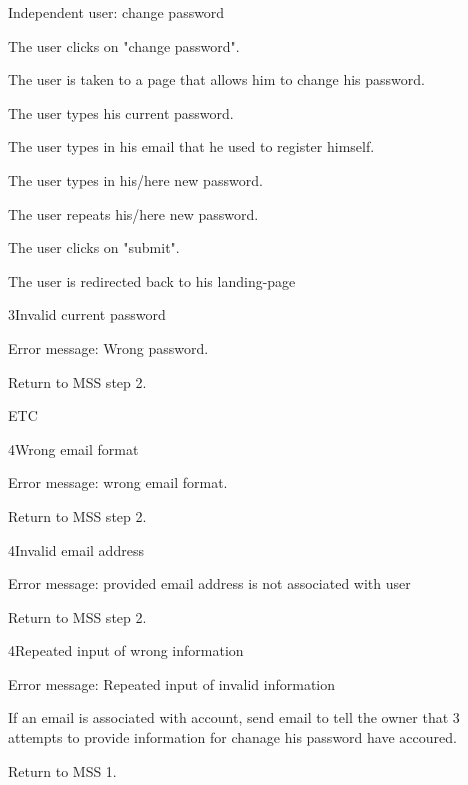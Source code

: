 \begin{uc}{Independent user: change password}

    \begin{uc-mss}
    \item The user clicks on "change password".
    \item The user is taken to a page that allows him to change his password.
    \item The user types his current password.
    \item The user types in his email that he used to register himself.
    \item The user types in his/here new password.
    \item The user repeats his/here new password.
    \item The user clicks on "submit".
    \item The user is redirected back to his landing-page
    \end{uc-mss}

    \begin{uc-ext}

        \begin{uc-fail}{3}{Invalid current password}
        \item Error message: Wrong password.
        \item Return to MSS step 2.
        \item ETC
        \end{uc-fail}

        \begin{uc-fail}{4}{Wrong email format}
        \item Error message: wrong email format.
        \item Return to MSS step 2.
        \end{uc-fail}

        \begin{uc-fail}{4}{Invalid email address}
        \item Error message: provided email address is not associated with user
        \item Return to MSS step 2.
        \end{uc-fail}

        \begin{uc-fail}{4}{Repeated input of wrong information}
        \item Error message: Repeated input of invalid information
        \item If an email is associated with account, send email to tell the owner that 3 attempts to provide information for chanage his password have accoured.
        \item Return to MSS 1.
        \end{uc-fail}


\end{uc-ext}
\end{uc}
